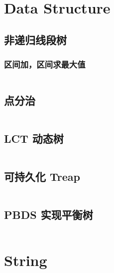 \documentclass[titlepage, a4paper, 11pt]{article}
\begin{document}
\begin{spacing}{1.15}
			\section{Data Structure}
				\subsection{非递归线段树}
					\subsubsection{区间加，区间求最大值}
						\inputminted{cpp}{src/DataStructure/非递归线段树求最大值.cpp}
				\subsection{点分治}
					\inputminted{cpp}{src/DataStructure/点分治.cpp}
				\subsection{LCT 动态树}
					\inputminted{cpp}{src/DataStructure/LCT.cpp}
				\subsection{可持久化 Treap}
					\inputminted{cpp}{src/DataStructure/可持久化treap-zmc.cpp}
				\subsection{PBDS 实现平衡树}
					\inputminted{cpp}{src/DataStructure/pbds.cpp}
			
			\section{String}

\end{spacing}
\end{document}
